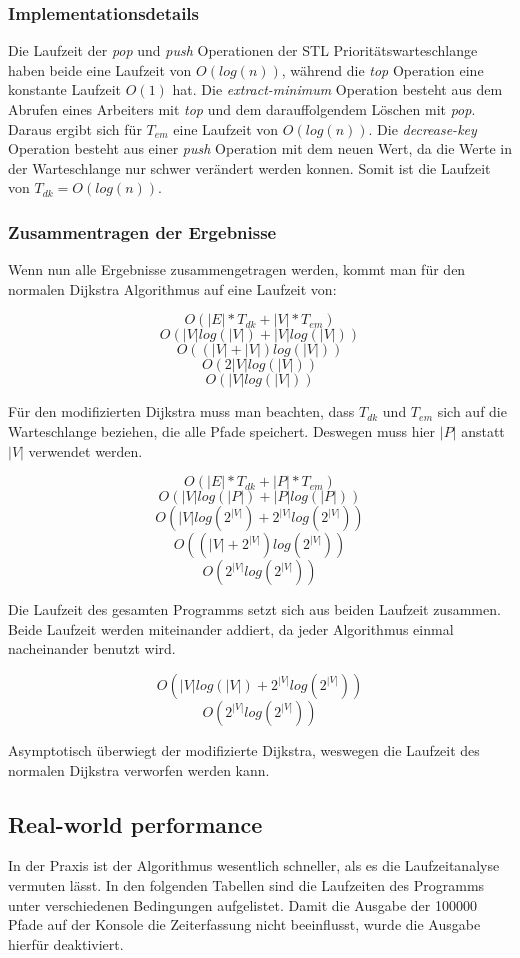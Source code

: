 \documentclass[a4paper,10pt,ngerman]{scrartcl}
\begin{document}
\subsubsection{Implementationsdetails}
Die Laufzeit der \textit{pop} und \textit{push} Operationen der STL Prioritätswarteschlange haben beide eine Laufzeit von $O(log(n))$,
während die \textit{top} Operation eine konstante Laufzeit $O(1)$ hat.
Die \textit{extract-minimum} Operation besteht aus dem Abrufen eines Arbeiters mit \textit{top} und dem darauffolgendem Löschen mit \textit{pop}.
Daraus ergibt sich für $T_{em}$ eine Laufzeit von $O(log(n))$.
Die \textit{decrease-key} Operation besteht aus einer \textit{push} Operation mit dem neuen Wert, da die Werte in der Warteschlange nur schwer verändert werden konnen.
Somit ist die Laufzeit von $T_{dk} = O(log(n))$.

\subsubsection{Zusammentragen der Ergebnisse}
Wenn nun alle Ergebnisse zusammengetragen werden, kommt man für den normalen Dijkstra Algorithmus auf eine Laufzeit von:

$$ O(|E| * T_{dk} + |V| * T_{em}) $$
$$ O(|V|log(|V|) + |V|log(|V|)) $$
$$ O((|V| + |V|)log(|V|)) $$
$$ O(2|V|log(|V|)) $$
$$ O(|V|log(|V|)) $$

Für den modifizierten Dijkstra muss man beachten, dass $T_{dk}$ und $T_{em}$ sich auf die Warteschlange beziehen, die alle Pfade speichert.
Deswegen muss hier $|P|$ anstatt $|V|$ verwendet werden.

$$ O(|E| * T_{dk} + |P| * T_{em}) $$
$$ O(|V|log(|P|) + |P|log(|P|)) $$
$$ O(|V|log(2^{|V|}) + 2^{|V|}log(2^{|V|})) $$
$$ O((|V| + 2^{|V|})log(2^{|V|})) $$
$$ O(2^{|V|}log(2^{|V|})) $$

Die Laufzeit des gesamten Programms setzt sich aus beiden Laufzeit zusammen. Beide Laufzeit werden miteinander addiert,
da jeder Algorithmus einmal nacheinander benutzt wird.

$$ O(|V|log(|V|) + 2^{|V|}log(2^{|V|})) $$
$$ O(2^{|V|}log(2^{|V|})) $$

Asymptotisch überwiegt der modifizierte Dijkstra, weswegen die Laufzeit des normalen Dijkstra verworfen werden kann.

\subsection{Real-world performance}
In der Praxis ist der Algorithmus wesentlich schneller, als es die Laufzeitanalyse vermuten lässt. In den folgenden Tabellen sind die Laufzeiten des Programms
unter verschiedenen Bedingungen aufgelistet. Damit die Ausgabe der 100000 Pfade auf der Konsole die Zeiterfassung nicht beeinflusst, wurde die Ausgabe hierfür deaktiviert.
\end{document}
